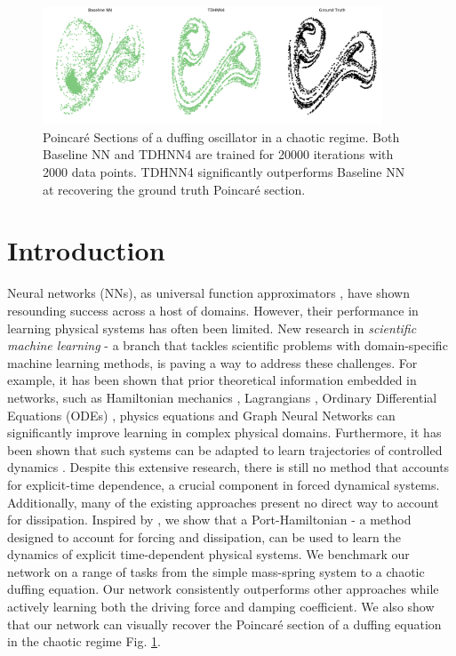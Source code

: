 \documentclass[twoside]{article}
\begin{document}
\begin{figure}[ht!]
\centering
\includegraphics[width=0.9\textwidth]{figures/main_fig.pdf}
\caption{Poincar\'e Sections of a duffing oscillator in a chaotic regime. Both Baseline NN and TDHNN4 are trained for 20000 iterations with 2000 data points. TDHNN4 significantly outperforms Baseline NN at recovering the ground truth Poincar\'e section.}
\label{fig.chaos1}
\end{figure}

\section{Introduction}

Neural networks (NNs), as universal function approximators \cite{hornik_multilayer_1989}, have shown resounding success across a host of domains. However, their performance in learning physical systems has often been limited. New research in \textit{scientific machine learning} - a branch that tackles scientific problems with domain-specific machine learning methods, is paving a way to address these challenges. For example, it has been shown that prior theoretical information embedded in networks, such as Hamiltonian mechanics \cite{greydanus_hamiltonian_2019}, Lagrangians \cite{cranmer_lagrangian_2020, lutter_deep_2019}, Ordinary Differential Equations (ODEs) \cite{chen_neural_2018}, physics equations \cite{raissi_physics_2017} and Graph Neural Networks \cite{battaglia_interaction_2016,sanchez-gonzalez_hamiltonian_2019} can significantly improve learning in complex physical domains. Furthermore, it has been shown that such systems can be adapted to learn trajectories of controlled dynamics \cite{lutter_deep_2019,zhong_dissipative_2020}. Despite this extensive research, there is still no method that accounts for explicit-time dependence, a crucial component in forced dynamical systems. Additionally, many of the existing approaches present no direct way to account for dissipation. Inspired by \cite{zhong_dissipative_2020}, we show that a Port-Hamiltonian - a method designed to account for forcing and dissipation, can be used to learn the dynamics of explicit time-dependent physical systems. We benchmark our network on a range of tasks from the simple mass-spring system to a chaotic duffing equation. Our network consistently outperforms other approaches while actively learning both the driving force and damping coefficient. We also show that our network can visually recover the Poincar\'e section of a duffing equation in the chaotic regime Fig. \ref{fig.chaos1}.
\end{document}
